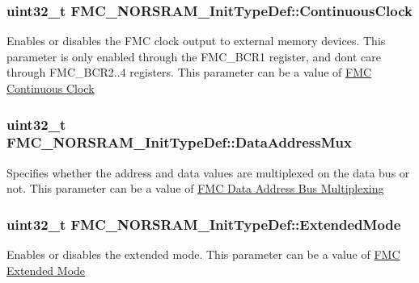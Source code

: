 \subsubsection[{\texorpdfstring{Continuous\+Clock}{ContinuousClock}}]{\setlength{\rightskip}{0pt plus 5cm}uint32\+\_\+t F\+M\+C\+\_\+\+N\+O\+R\+S\+R\+A\+M\+\_\+\+Init\+Type\+Def\+::\+Continuous\+Clock}\hypertarget{struct_f_m_c___n_o_r_s_r_a_m___init_type_def_afeddf8d3760034019b347645ef85e31e}{}\label{struct_f_m_c___n_o_r_s_r_a_m___init_type_def_afeddf8d3760034019b347645ef85e31e}
Enables or disables the F\+MC clock output to external memory devices. This parameter is only enabled through the F\+M\+C\+\_\+\+B\+C\+R1 register, and don\textquotesingle{}t care through F\+M\+C\+\_\+\+B\+C\+R2..4 registers. This parameter can be a value of \hyperlink{group___f_m_c___continous___clock}{F\+MC Continuous Clock} 
\subsubsection[{\texorpdfstring{Data\+Address\+Mux}{DataAddressMux}}]{\setlength{\rightskip}{0pt plus 5cm}uint32\+\_\+t F\+M\+C\+\_\+\+N\+O\+R\+S\+R\+A\+M\+\_\+\+Init\+Type\+Def\+::\+Data\+Address\+Mux}\hypertarget{struct_f_m_c___n_o_r_s_r_a_m___init_type_def_a5b7e34c6d9947bbd35fdede522088372}{}\label{struct_f_m_c___n_o_r_s_r_a_m___init_type_def_a5b7e34c6d9947bbd35fdede522088372}
Specifies whether the address and data values are multiplexed on the data bus or not. This parameter can be a value of \hyperlink{group___f_m_c___data___address___bus___multiplexing}{F\+MC Data Address Bus Multiplexing} 
\subsubsection[{\texorpdfstring{Extended\+Mode}{ExtendedMode}}]{\setlength{\rightskip}{0pt plus 5cm}uint32\+\_\+t F\+M\+C\+\_\+\+N\+O\+R\+S\+R\+A\+M\+\_\+\+Init\+Type\+Def\+::\+Extended\+Mode}\hypertarget{struct_f_m_c___n_o_r_s_r_a_m___init_type_def_a4e181791a7d3f24a7899eff5e03efe44}{}\label{struct_f_m_c___n_o_r_s_r_a_m___init_type_def_a4e181791a7d3f24a7899eff5e03efe44}
Enables or disables the extended mode. This parameter can be a value of \hyperlink{group___f_m_c___extended___mode}{F\+MC Extended Mode} 
